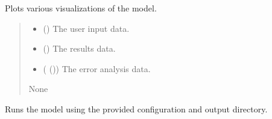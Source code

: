 \documentclass[a4paper,11pt,english,openany]{sphinxmanual}
\begin{document}
\begin{fulllineitems}
\begin{fulllineitems}
\label{\detokenize{api/spyice.main_process:src.spyice.main_process.MainProcess.plot_model}}
\pysigstartsignatures
\pysiglinewithargsret
{}
{\sphinxparamcomma {}\sphinxparamcomma {}}
{}
\pysigstopsignatures
\sphinxAtStartPar
Plots various visualizations of the model.
\begin{quote}\begin{description}
\begin{itemize}
\item {} 
\sphinxAtStartPar
{} () \textendash{} The user input data.

\item {} 
\sphinxAtStartPar
{} () \textendash{} The results data.

\item {} 
\sphinxAtStartPar
{} ({\hyperref[\detokenize{api/spyice.postprocess.analysis:src.spyice.postprocess.analysis.AnalysisData}]{}} ()) \textendash{} The error analysis data.

\end{itemize}

\sphinxAtStartPar
None

\sphinxAtStartPar
{} \textendash{} 

\end{description}\end{quote}

\end{fulllineitems}


\begin{fulllineitems}
\label{\detokenize{api/spyice.main_process:src.spyice.main_process.MainProcess.run_model}}
\pysigstartsignatures
\pysiglinewithargsret
{}
{}
{}
\pysigstopsignatures
\sphinxAtStartPar
Runs the model using the provided configuration and output directory.
\begin{quote}\begin{description}
\sphinxAtStartPar
{}


\end{description}
\end{quote}
\end{fulllineitems}
\end{fulllineitems}
\end{document}
